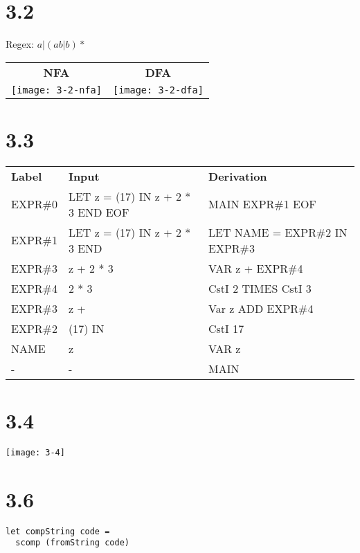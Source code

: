\documentclass{article}
\begin{document}
\section*{3.2}

Regex: $a|(ab|b)*$

\vspace{10 mm}

\begin{tabular}{c c}
\textbf{NFA} & \textbf{DFA} \\
\texttt{[image: 3-2-nfa]} & \texttt{[image: 3-2-dfa]}
\end{tabular}

\section*{3.3}

\begin{tabular}{l l l}
\textbf{Label} & \textbf{Input} & \textbf{Derivation} \\
EXPR\#0 & LET z = (17) IN z + 2 * 3 END EOF & MAIN EXPR\#1 EOF \\
EXPR\#1 & LET z = (17) IN z + 2 * 3 END & LET NAME = EXPR\#2 IN EXPR\#3 \\
EXPR\#3 & z + 2 * 3 & VAR z + EXPR\#4 \\
EXPR\#4 & 2 * 3 & CstI 2 TIMES CstI 3 \\
EXPR\#3 & z + & Var z ADD EXPR\#4 \\
EXPR\#2 & (17) IN & CstI 17 \\
NAME    & z & VAR z \\
-       & - & MAIN

\end{tabular}

\section*{3.4}

\texttt{[image: 3-4]}

\section*{3.6}

\begin{verbatim}
let compString code =
  scomp (fromString code)
\end{verbatim}
\end{document}
